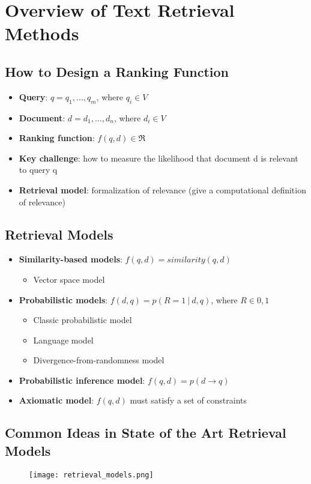 \newpage
\section{Overview of Text Retrieval Methods}

\subsection{How to Design a Ranking Function}
\begin{itemize}
\item \textbf{Query}: $q = q_1,\dots ,q_m$, where $q_i \in V$
\item \textbf{Document}: $d = d_1,\dots ,d_n$, where $d_i \in V$
\item \textbf{Ranking function}: $f(q,d) \in \Re$
\item \textbf{Key challenge}: how to measure the likelihood that document d is relevant to query q
\item \textbf{Retrieval model}: formalization of relevance (give a computational definition of relevance)
\end{itemize}


\subsection{Retrieval Models}
\begin{itemize}
\item \textbf{Similarity-based models}: $f(q,d) = similarity(q,d)$
    \begin{itemize}
    \item Vector space model
    \end{itemize}
\item \textbf{Probabilistic models}: $f(d,q) = p(R=1 \:\big|\: d,q)$, where $R \in {0,1}$ 
    \begin{itemize}       
    \item Classic probabilistic model
    \item Language model
    \item Divergence-from-randomness model    
    \end{itemize}
\item \textbf{Probabilistic inference model}: $f(q,d) = p(d \rightarrow q)$
\item \textbf{Axiomatic model}: $f(q,d)$ must satisfy a set of constraints
\end{itemize}    


\subsection{Common Ideas in State of the Art Retrieval Models}
\begin{figure}[H]
    \centering
    \texttt{[image: retrieval\_models.png]}
\end{figure}


